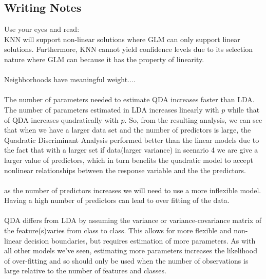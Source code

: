\documentclass[11pt, oneside]{article}
\begin{document}
\subsection*{Writing Notes}
Use your eyes and read:\\
KNN will support non-linear solutions where GLM can only support linear solutions. Furthermore, KNN cannot yield confidence levels due to its selection nature where GLM can because it has the property of linearity.\\
\\
Neighborhoods have meaningful weight....\\
\\
The number of parameters needed to estimate QDA increases faster than LDA. The number of parameters estimated in LDA increases linearly with $p$ while that of QDA increases quadratically with $p$. So, from the resulting analysis, we can see that when  we have a larger data set and the number of predictors is large, the Quadratic Discriminant Analysis  performed better  than the linear models due to the fact that with a larger set if data(larger variance) in scenario 4 we are give  a larger value of predictors, which in turn benefits the quadratic model to accept nonlinear relationships between the response variable and the the predictors.\\
\\
as the number of predictors increases we will need to use a more inflexible model. Having a high number of predictors can lead to over fitting of the data.\\
\\
QDA differs from LDA by assuming the variance or variance-covariance matrix of the feature(s)varies from class to class.  This allows for more flexible and non-linear decision boundaries,  but requires  estimation  of  more  parameters.   As  with  all  other  models  we’ve  seen,  estimating  more parameters increases the likelihood of over-fitting and so should only be used when the number of observations is large relative to the number of features and classes.
\end{document}
